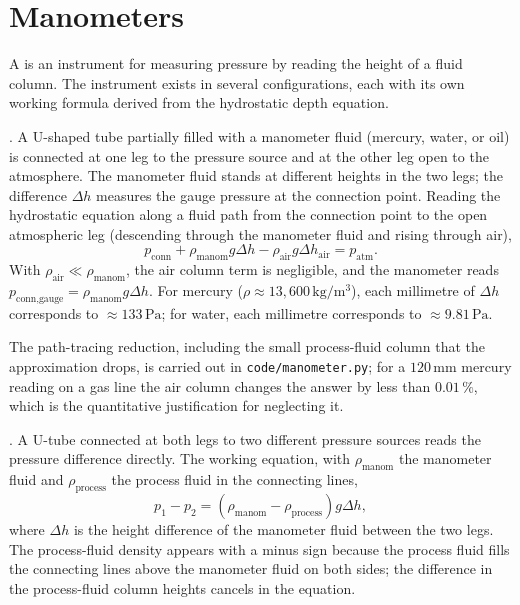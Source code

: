 

\section{Manometers}

A  is an instrument for measuring pressure
by reading the height of a fluid column. The instrument exists in
several configurations, each with its own working formula derived
from the hydrostatic depth equation.

. A U-shaped tube
partially filled with a manometer fluid (mercury, water, or oil)
is connected at one leg to the pressure source and at the other
leg open to the atmosphere. The manometer fluid stands at
different heights in the two legs; the difference $\Delta h$
measures the gauge pressure at the connection point. Reading the
hydrostatic equation along a fluid path from the connection point
to the open atmospheric leg (descending through the manometer
fluid and rising through air),
\[
p_{\text{conn}} + \rho_{\text{manom}} g \Delta h - \rho_{\text{air
}} g \Delta h_{\text{air}} = p_{\text{atm}}.
\]
With $\rho_{\text{air}} \ll \rho_{\text{manom}}$, the air column
term is negligible, and the manometer reads $p_{\text{conn,gauge}}
= \rho_{\text{manom}} g \Delta h$. For mercury ($\rho \approx
13{,}600\,\si{\kilogram\per\meter\cubed}$), each millimetre of
$\Delta h$ corresponds to $\approx 133\,\text{Pa}$; for water,
each millimetre corresponds to $\approx 9.81\,\text{Pa}$.



The path-tracing reduction, including the small process-fluid column
that the approximation drops, is carried out in
\texttt{code/manometer.py}; for a $120\,\si{\milli\meter}$ mercury
reading on a gas line the air column changes the answer by less than
$0.01\,\%$, which is the quantitative justification for neglecting it.

. A U-tube connected at both
legs to two different pressure sources reads the pressure
difference directly. The working equation, with $\rho_{\text{manom}
}$ the manometer fluid and $\rho_{\text{process}}$ the process
fluid in the connecting lines,
\[
p_1 - p_2 = (\rho_{\text{manom}} - \rho_{\text{process}}) g \Delta
h,
\]
where $\Delta h$ is the height difference of the manometer fluid
between the two legs. The process-fluid density appears with a
minus sign because the process fluid fills the connecting lines
above the manometer fluid on both sides; the difference in the
process-fluid column heights cancels in the equation.

